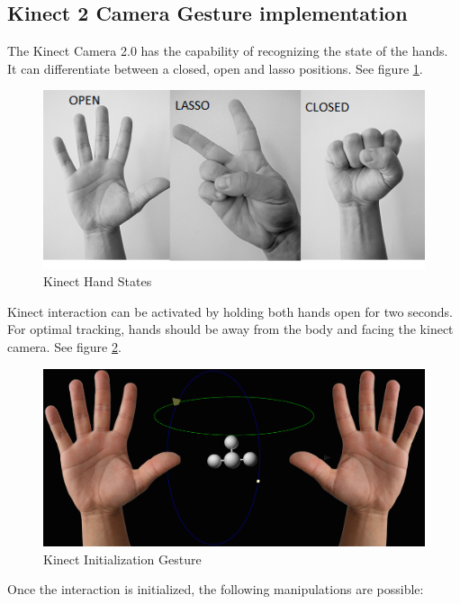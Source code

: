 \documentclass[12pt]{extarticle}
\begin{document}
\begin{appendices}
\subsection {Kinect 2 Camera Gesture implementation}\label{app:KinectGestures}
The Kinect Camera 2.0 has the capability of recognizing the state of the hands. It can differentiate between a closed, open and lasso positions.
See figure \ref{fig: AKHS}.
\begin{center}
\begin{figure}[!h]
\includegraphics[scale=1.5]{Images/KinectHandStates.png}
\caption{Kinect Hand States}
\label{fig: AKHS}
\end{figure}
\end{center}
Kinect interaction can be activated by holding both hands open for two seconds. For optimal tracking, hands should be away from the body and facing the kinect camera.
See figure \ref{fig: AKI}.
\begin{center}
\begin{figure}[!h]
\includegraphics[scale=0.4]{Images/KinectInitialize.png}
\caption{Kinect Initialization Gesture}
\label{fig: AKI}
\end{figure}
\end{center}
Once the interaction is initialized, the following manipulations are possible:

\end{appendices}
\end{document}
